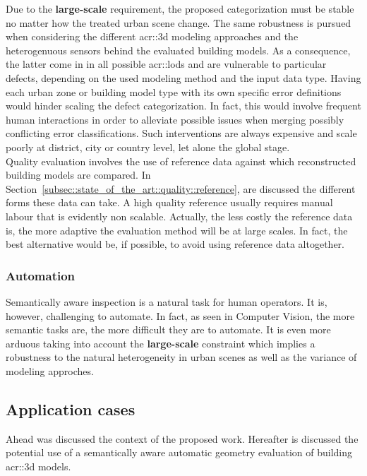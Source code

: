             Due to the \textbf{large-scale} requirement, the proposed categorization must be stable no matter how the treated urban scene change.
            The same robustness is pursued when considering the different \gls{acr::3d} modeling approaches and the heterogenuous sensors behind the evaluated building models.
            As a consequence, the latter come in in all possible \glspl{acr::lod} and are vulnerable to particular defects, depending on the used modeling method and the input data type.
            Having each urban zone or building model type with its own specific error definitions would hinder scaling the defect categorization.
            In fact, this would involve frequent human interactions in order to alleviate possible issues when merging possibly conflicting error classifications.
            Such interventions are always expensive and scale poorly at district, city or country level, let alone the global stage.\\

            Quality evaluation involves the use of reference data against which reconstructed building models are compared.
            In Section~\ref{subsec::state_of_the_art::quality::reference}, are discussed the different forms these data can take.
            A high quality reference usually requires manual labour that is evidently non scalable.
            Actually, the less costly the reference data is, the more adaptive the evaluation method will be at large scales.
            In fact, the best alternative would be, if possible, to avoid using reference data altogether.

        \subsubsection{Automation}
            Semantically aware inspection is a natural task for human operators.
            It is, however, challenging to automate.
            In fact, as seen in Computer Vision, the more semantic tasks are, the more difficult they are to automate.
            It is even more arduous taking into account the \textbf{large-scale} constraint which implies a robustness to the natural heterogeneity in urban scenes as well as the variance of modeling approches.

    \subsection{Application cases}
        \label{subsec::introduction::contributions::use}
        Ahead was discussed the context of the proposed work.
        Hereafter is discussed the potential use of a semantically aware automatic geometry evaluation of building \gls{acr::3d} models.
